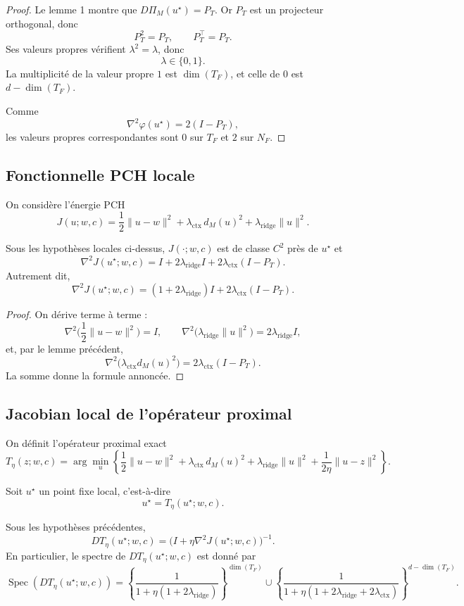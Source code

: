 \begin{proof}
Le lemme 1 montre que $D\Pi_M(u^\star)=P_T$. Or $P_T$ est un projecteur orthogonal, donc
\[
P_T^2=P_T,\qquad P_T^\top=P_T.
\]
Ses valeurs propres vérifient $\lambda^2=\lambda$, donc
\[
\lambda\in\{0,1\}.
\]
La multiplicité de la valeur propre $1$ est $\dim(T_F)$, et celle de $0$ est $d-\dim(T_F)$.

Comme
\[
\nabla^2\varphi(u^\star)=2(I-P_T),
\]
les valeurs propres correspondantes sont $0$ sur $T_F$ et $2$ sur $N_F$.
\end{proof}

\subsection{Fonctionnelle PCH locale}

On considère l'énergie PCH
\[
J(u;w,c)
=
\frac12\|u-w\|^2
+
\lambda_{\mathrm{ctx}}\,d_M(u)^2
+
\lambda_{\mathrm{ridge}}\|u\|^2.
\]

Sous les hypothèses locales ci-dessus, $J(\cdot;w,c)$ est de classe $C^2$ près de $u^\star$ et
\[
\nabla^2 J(u^\star;w,c)
=
I+2\lambda_{\mathrm{ridge}}I+2\lambda_{\mathrm{ctx}}(I-P_T).
\]
Autrement dit,
\[
\nabla^2 J(u^\star;w,c)
=
(1+2\lambda_{\mathrm{ridge}})I+2\lambda_{\mathrm{ctx}}(I-P_T).
\]

\begin{proof}
On dérive terme à terme :
\[
\nabla^2\Big(\frac12\|u-w\|^2\Big)=I,\qquad
\nabla^2\big(\lambda_{\mathrm{ridge}}\|u\|^2\big)=2\lambda_{\mathrm{ridge}}I,
\]
et, par le lemme précédent,
\[
\nabla^2\big(\lambda_{\mathrm{ctx}}d_M(u)^2\big)
=
2\lambda_{\mathrm{ctx}}(I-P_T).
\]
La somme donne la formule annoncée.
\end{proof}

\subsection{Jacobian local de l'opérateur proximal}

On définit l'opérateur proximal exact
\[
T_\eta(z;w,c)
=
\arg\min_u
\left\{
\frac12\|u-w\|^2
+
\lambda_{\mathrm{ctx}}\,d_M(u)^2
+
\lambda_{\mathrm{ridge}}\|u\|^2
+
\frac1{2\eta}\|u-z\|^2
\right\}.
\]

Soit $u^\star$ un point fixe local, c'est-à-dire
\[
u^\star=T_\eta(u^\star;w,c).
\]

\begin{theorem}
Sous les hypothèses précédentes,
\[
DT_\eta(u^\star;w,c)
=
\bigl(I+\eta \nabla^2J(u^\star;w,c)\bigr)^{-1}.
\]
En particulier, le spectre de $DT_\eta(u^\star;w,c)$ est donné par
\[
\operatorname{Spec}(DT_\eta(u^\star;w,c))
=
\left\{
\frac1{1+\eta(1+2\lambda_{\mathrm{ridge}})}
\right\}^{\dim(T_F)}
\cup
\left\{
\frac1{1+\eta(1+2\lambda_{\mathrm{ridge}}+2\lambda_{\mathrm{ctx}})}
\right\}^{d-\dim(T_F)}.
\]
\end{theorem}

